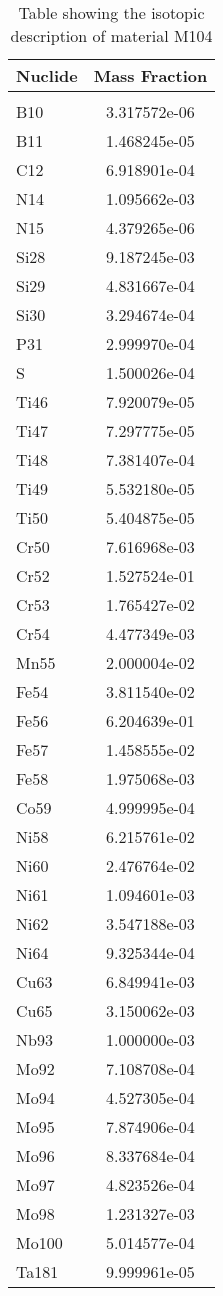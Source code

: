 \begin{centering}
\begin{table}[ht!]
\begin{tabular}{l | c}
\hline
Nuclide & Mass Fraction\\
\hline
\\
B10 & 3.317572e-06\\
B11 & 1.468245e-05\\
C12 & 6.918901e-04\\
N14 & 1.095662e-03\\
N15 & 4.379265e-06\\
Si28 & 9.187245e-03\\
Si29 & 4.831667e-04\\
Si30 & 3.294674e-04\\
P31 & 2.999970e-04\\
S & 1.500026e-04\\
Ti46 & 7.920079e-05\\
Ti47 & 7.297775e-05\\
Ti48 & 7.381407e-04\\
Ti49 & 5.532180e-05\\
Ti50 & 5.404875e-05\\
Cr50 & 7.616968e-03\\
Cr52 & 1.527524e-01\\
Cr53 & 1.765427e-02\\
Cr54 & 4.477349e-03\\
Mn55 & 2.000004e-02\\
Fe54 & 3.811540e-02\\
Fe56 & 6.204639e-01\\
Fe57 & 1.458555e-02\\
Fe58 & 1.975068e-03\\
Co59 & 4.999995e-04\\
Ni58 & 6.215761e-02\\
Ni60 & 2.476764e-02\\
Ni61 & 1.094601e-03\\
Ni62 & 3.547188e-03\\
Ni64 & 9.325344e-04\\
Cu63 & 6.849941e-03\\
Cu65 & 3.150062e-03\\
Nb93 & 1.000000e-03\\
Mo92 & 7.108708e-04\\
Mo94 & 4.527305e-04\\
Mo95 & 7.874906e-04\\
Mo96 & 8.337684e-04\\
Mo97 & 4.823526e-04\\
Mo98 & 1.231327e-03\\
Mo100 & 5.014577e-04\\
Ta181 & 9.999961e-05
\end{tabular}
\caption{Table showing the isotopic description of material M104}
\label{table:material_M104}
\end{table}\clearpage


\end{centering}
